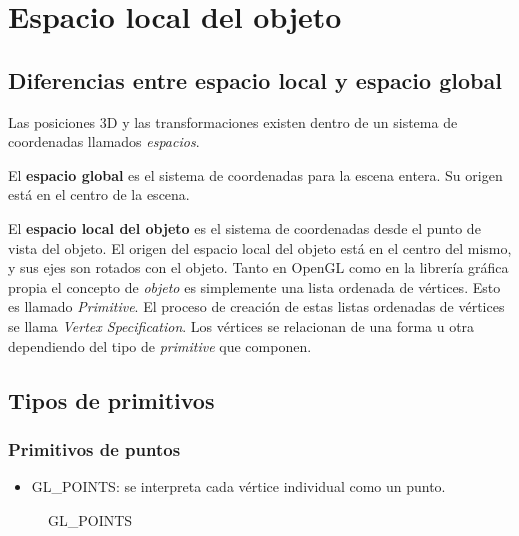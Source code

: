 \chapter{Espacio local del objeto}
\section{Diferencias entre espacio local y espacio global}
Las posiciones 3D y las transformaciones existen dentro de un sistema de coordenadas llamados \textit{espacios}.

El \textbf{espacio global} es el sistema de coordenadas para la escena entera. Su origen está en el centro de la escena.

El \textbf{espacio local del objeto} es el sistema de coordenadas desde el punto de vista del objeto. El origen del espacio local del objeto está en el centro del mismo, y sus ejes son rotados con el objeto. Tanto en OpenGL como en la librería gráfica propia el concepto de \textit{objeto} es simplemente una lista ordenada de vértices. Esto es llamado \textit{Primitive}. El proceso de creación de estas listas ordenadas de vértices se llama \textit{Vertex Specification}. Los vértices se relacionan de una forma u otra dependiendo del tipo de \textit{primitive} que componen. 

\newpage


\section{Tipos de primitivos}

\subsection{Primitivos de puntos}
\begin{itemize}
\item{GL\_POINTS: se interpreta cada vértice individual como un punto.}

\end{itemize}

\begin{figure} [h]
  \centering
  \caption{GL\_POINTS}
\end{figure}

